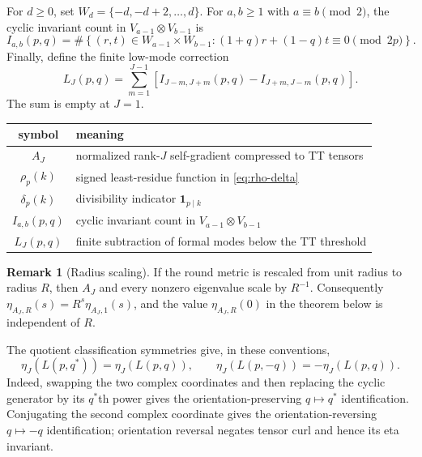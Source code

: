 \documentclass[11pt]{article}
\theoremstyle{definition}
\newtheorem{remark}[theorem]{Remark}
\begin{document}
For $d\geq0$, set $W_d=\{-d,-d+2,\ldots,d\}$.  For $a,b\geq1$ with
$a\equiv b\pmod2$, the cyclic invariant count in
$V_{a-1}\otimes V_{b-1}$ is
\begin{equation}
 I_{a,b}(p,q)=\#\left\{(r,t)\in W_{a-1}\times W_{b-1}:
 (1+q)r+(1-q)t\equiv0\pmod{2p}\right\}.
 \label{eq:Iab}
\end{equation}
Finally, define the finite low-mode correction
\begin{equation}
 L_J(p,q)=\sum_{m=1}^{J-1}
 \left[I_{J-m,J+m}(p,q)-I_{J+m,J-m}(p,q)\right].
 \label{eq:low-mode}
\end{equation}
The sum is empty at $J=1$.

\begin{center}
\begin{tabular}{c|l}
\hline
symbol & meaning\\
\hline
$A_J$ & normalized rank-$J$ self-gradient compressed to TT tensors\\
$\rho_p(k)$ & signed least-residue function in \eqref{eq:rho-delta}\\
$\delta_p(k)$ & divisibility indicator $\mathbf 1_{p\mid k}$\\
$I_{a,b}(p,q)$ & cyclic invariant count in
  $V_{a-1}\otimes V_{b-1}$\\
$L_J(p,q)$ & finite subtraction of formal modes below the TT threshold\\
\hline
\end{tabular}
\end{center}

\begin{remark}[Radius scaling]
\label{rem:radius-scaling}
If the round metric is rescaled from unit radius to radius $R$, then
$A_J$ and every nonzero eigenvalue scale by $R^{-1}$.  Consequently
$\eta_{A_J,R}(s)=R^s\eta_{A_J,1}(s)$, and the value
$\eta_{A_J,R}(0)$ in the theorem below is independent of $R$.
\end{remark}

The quotient classification symmetries give, in these conventions,
\begin{equation}
 \eta_J(L(p,q^*))=\eta_J(L(p,q)),
 \qquad
\eta_J(L(p,-q))=-\eta_J(L(p,q)).
\label{eq:lens-symmetries}
\end{equation}
Indeed, swapping the two complex coordinates and then replacing the cyclic
generator by its $q^*$th power gives the orientation-preserving
$q\mapsto q^*$ identification.  Conjugating the second complex coordinate
gives the orientation-reversing $q\mapsto-q$ identification; orientation
reversal negates tensor curl and hence its eta invariant.
\end{document}
